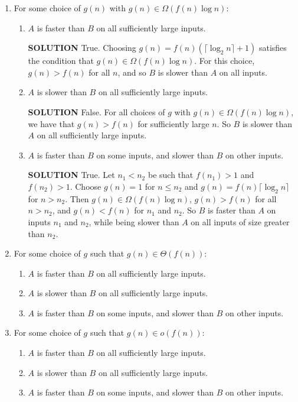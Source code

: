 \documentclass[11pt]{article}
\begin{document}
\begin{enumerate}
\item For some choice of $g(n)$ with $g(n) \in \Omega(f(n) \log n)$:
\begin{enumerate}
\item $A$ is faster than $B$ on all sufficiently large inputs.

\textbf{SOLUTION}
True. Choosing $g(n) = f(n) (\lceil \log_2 n \rceil + 1)$ satisfies the condition that
$g(n) \in \Omega(f(n) \log n)$.  For this choice, $g(n) > f(n)$
for all $n$, and so $B$ is slower than $A$ on all inputs.

\item $A$ is slower than $B$ on all sufficiently large inputs.

\textbf{SOLUTION}
False. For all choices of $g$ with $g(n) \in
     \Omega(f(n) \log n)$, we have that $g(n) > f(n)$ for sufficiently large $n$. 
So $B$ is slower than $A$ on all sufficiently large inputs.

\item $A$ is faster than $B$ on some inputs, and slower than $B$ on other inputs.

\textbf{SOLUTION} True. Let $n_1 < n_2$ be such that $f(n_1) > 1$ and $f(n_2) > 1$.
Choose $g(n) = 1$ for $n \le n_2$ and $g(n) = f(n) \lceil \log_2 n \rceil$ for $n > n_2$.
Then $g(n) \in \Omega(f(n) \log n)$, $g(n) > f(n)$
for all $n > n_2$, and $g(n) < f(n)$ for $n_1$ and $n_2$.
So $B$ is faster than $A$ on inputs $n_1$ and $n_2$, while being slower
than $A$ on all inputs of size greater than $n_2$.
\end{enumerate}

\item For some choice of $g$ such that $g(n) \in \Theta(f(n))$:
\begin{enumerate}
\item $A$ is faster than $B$ on all sufficiently large inputs.

\item $A$ is slower than $B$ on all sufficiently large inputs.

\item $A$ is faster than $B$ on some inputs, and slower than $B$ on other inputs.
\end{enumerate}

\item For some choice of $g$ such that $g(n) \in o(f(n))$:

\begin{enumerate}
\item $A$ is faster than $B$ on all sufficiently large inputs.

\item $A$ is slower than $B$ on all sufficiently large inputs.

\item $A$ is faster than $B$ on some inputs, and slower than $B$ on other inputs.
\end{enumerate}
\end{enumerate}
\end{document}
